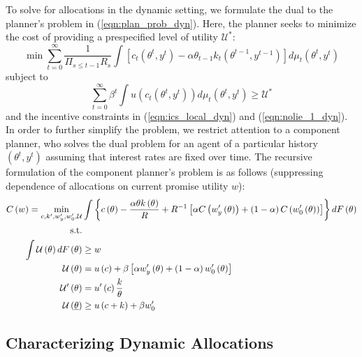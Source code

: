 \documentclass[11pt]{article}
\begin{document}
To solve for allocations in the dynamic setting, we formulate the dual to the planner's problem in (\ref{eqn:plan_prob_dyn}). Here, the planner seeks to minimize the cost of providing a prespecified level of utility \( \mathcal{U}^* \):
\begin{equation}
    \min\sum_{t=0}^{\infty}\frac{1}{\Pi_{s\leq t-1}R_{s}}\int\left[c_{t}\left(\theta^{t},y^{t}\right)-\alpha\theta_{t-1}k_{t}\left(\theta^{t-1},y^{t-1}\right)\right]d\mu_{t}\left(\theta^{t},y^{t}\right) \label{eqn:plan_obj_dual}
\end{equation}
subject to 
\begin{equation}
    \sum_{t=0}^{\infty}\beta^t\int u\left(c_{t}\left(\theta^{t},y^{t}\right)\right)d\mu_{t}\left(\theta^{t},y^{t}\right) \ge \mathcal{U}^* \label{eqn:plan_constr_dual}
\end{equation}
and the incentive constraints in (\ref{eqn:ics_local_dyn}) and (\ref{eqn:nolie_1_dyn}). In order to further simplify the problem, we restrict attention to a component planner, who solves the dual problem for an agent of a particular history \( \left( \theta^t,y^t \right) \) assuming that interest rates are fixed over time. The recursive formulation of the component planner's problem is as follows (suppressing dependence of allocations on current promise utility \( w \)):
\begin{align}
    C\left(w\right)=\min_{c,k',w_{y}^{\prime},w_{0}^{\prime},\mathcal{U}}& \int\left\{ c\left(\theta\right)-\frac{\alpha\theta k\left(\theta\right)}{R}+R^{-1}\left[\alpha C\left(w_{y}^{\prime}\left(\theta\right)\right)+\left(1-\alpha\right)C\left(w_{0}'\left(\theta\right)\right)\right]\right\} dF\left(\theta\right) \label{eqn:plan_rec} \\
    \text{s.t.}& \notag \\
    \int\mathcal{U}\left(\theta\right)dF\left(\theta\right) &\ge w \notag \\
    \mathcal{U}\left(\theta\right) &= u\left(c\right)+\beta\left[\alpha w_{y}^{\prime}\left(\theta\right)+\left(1-\alpha\right)w_{0}^{\prime}\left(\theta\right)\right] \notag \\
    \mathcal{U}^{\prime}\left(\theta\right) &= u^{\prime}\left(c\right)\frac{k}{\theta} \notag \\
    \mathcal{U}\left(\underline{\theta}\right) &\ge u\left(c+k\right)+\beta w_{0}^{\prime} \notag
\end{align}

\subsection{Characterizing Dynamic Allocations} \label{sec:alloc_dyn}
\end{document}

